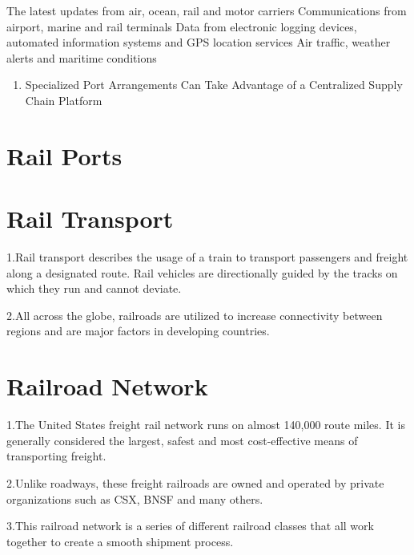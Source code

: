 \documentclass[
]{book}
\providecommand{\tightlist}{%
  \setlength{\itemsep}{0pt}\setlength{\parskip}{0pt}}
\begin{document}
The latest updates from air, ocean, rail and motor carriers
Communications from airport, marine and rail terminals
Data from electronic logging devices, automated information systems and GPS location services
Air traffic, weather alerts and maritime conditions

\begin{enumerate}
\def\labelenumi{\arabic{enumi}.}
\setcounter{enumi}{6}
\tightlist
\item
  Specialized Port Arrangements Can Take Advantage of a Centralized Supply Chain Platform
\end{enumerate}

\hypertarget{SupplyChain-Railport}{%
\section{Rail Ports}\label{SupplyChain-Railport}}

\hypertarget{SupplyChain-RailTransport}{%
\section{Rail Transport}\label{SupplyChain-RailTransport}}

1.Rail transport describes the usage of a train to transport passengers and freight along a designated route. Rail vehicles are directionally guided by the tracks on which they run and cannot deviate.

2.All across the globe, railroads are utilized to increase connectivity between regions and are major factors in developing countries.

\hypertarget{SupplyChain-Railroadnetwork}{%
\section{Railroad Network}\label{SupplyChain-Railroadnetwork}}

1.The United States freight rail network runs on almost 140,000 route miles. It is generally considered the largest, safest and most cost-effective means of transporting freight.

2.Unlike roadways, these freight railroads are owned and operated by private organizations such as CSX, BNSF and many others.

3.This railroad network is a series of different railroad classes that all work together to create a smooth shipment process.
\end{document}
